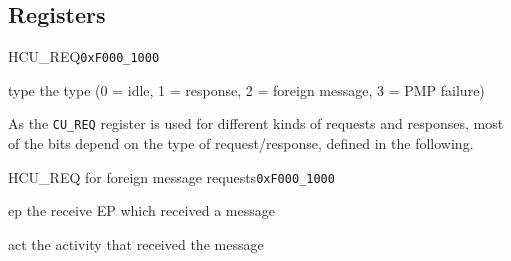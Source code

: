 \begin{algorithm}[H]
    \caption{Dequeuing and finishing of CU requests.}
    \label{code:cureqfinish}
\end{algorithm}

\subsection{Registers}

\begin{register}{H}{CU\_REQ}{\texttt{0xF000\_1000}}
  \regnewline%
  \begin{regdesc}\begin{reglist}
    \item[type] the type (0 = idle, 1 = response, 2 = foreign message, 3 = PMP failure)
  \end{reglist}\end{regdesc}
\end{register}

\noindent As the \texttt{CU\_REQ} register is used for different kinds of requests and responses,
most of the bits depend on the type of request/response, defined in the following.

\begin{register}{H}{CU\_REQ for foreign message requests}{\texttt{0xF000\_1000}}
  \regnewline%
  \begin{regdesc}\begin{reglist}
    \item[ep] the receive EP which received a message
    \item[act] the activity that received the message
  \end{reglist}\end{regdesc}
\end{register}

